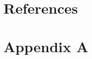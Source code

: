 
\chapter{References}

\printbibliography[heading=none,title={}]


\appendix
\renewcommand\chaptername{Appendix}

\renewcommand{\thechapter}{A}
\renewcommand\chaptername{Appendix A}

\chapter{Appendix A}



